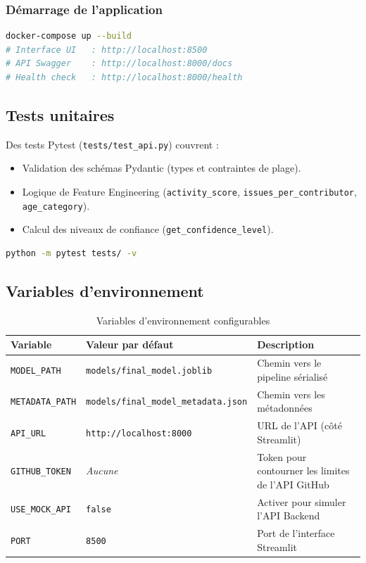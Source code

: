 \documentclass[12pt,a4paper]{article}
\begin{document}
\subsubsection{Démarrage de l'application}

\begin{lstlisting}[language=bash, caption={Démarrage avec Docker Compose}]
docker-compose up --build
# Interface UI   : http://localhost:8500
# API Swagger    : http://localhost:8000/docs
# Health check   : http://localhost:8000/health
\end{lstlisting}

\subsection{Tests unitaires}

Des tests Pytest (\texttt{tests/test\_api.py}) couvrent :
\begin{itemize}[noitemsep]
  \item Validation des schémas Pydantic (types et contraintes de plage).
  \item Logique de Feature Engineering (\texttt{activity\_score}, \texttt{issues\_per\_contributor},
    \texttt{age\_category}).
  \item Calcul des niveaux de confiance (\texttt{get\_confidence\_level}).
\end{itemize}

\begin{lstlisting}[language=bash, caption={Exécution des tests unitaires}]
python -m pytest tests/ -v
\end{lstlisting}

\subsection{Variables d'environnement}

\begin{table}[H]
  \centering
  \caption{Variables d'environnement configurables}
  \label{tab:env}
  \begin{tabularx}{\linewidth}{llL}
    \toprule
    \textbf{Variable} & \textbf{Valeur par défaut} & \textbf{Description} \\
    \midrule
    \texttt{MODEL\_PATH} & \texttt{models/final\_model.joblib} & Chemin vers le pipeline sérialisé \\
    \texttt{METADATA\_PATH} & \texttt{models/final\_model\_metadata.json} & Chemin vers les métadonnées \\
    \texttt{API\_URL} & \texttt{http://localhost:8000} & URL de l'API (côté Streamlit) \\
    \texttt{GITHUB\_TOKEN} & \textit{Aucune} & Token pour contourner les limites de l'API GitHub \\
    \texttt{USE\_MOCK\_API} & \texttt{false} & Activer pour simuler l'API Backend \\
    \texttt{PORT} & \texttt{8500} & Port de l'interface Streamlit \\
    \bottomrule
  \end{tabularx}
\end{table}
\end{document}
